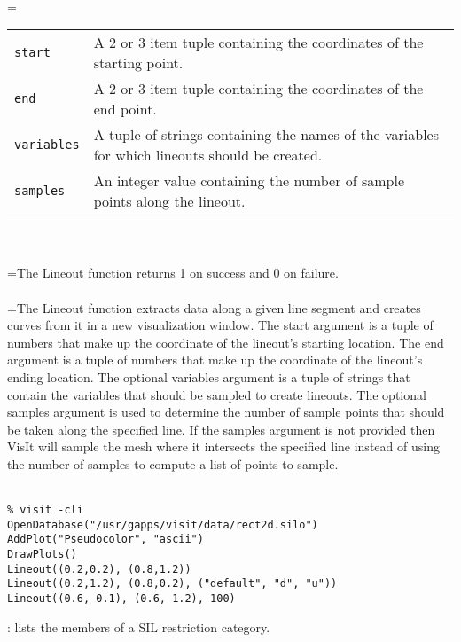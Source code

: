 \documentclass[10pt,a4paper]{report}
\begin{document}
 \\ 
\hangindent=\parindent 
\begin{tabular}{lp{9cm}}
\verb!start! & A 2 or 3 item tuple containing the coordinates of the starting point. \\
\verb!end! & A 2 or 3 item tuple containing the coordinates of the end point. \\
\verb!variables! & A tuple of strings containing the names of the variables for which lineouts should be created. \\
\verb!samples! & An integer value containing the number of sample points along the lineout. \\
\end{tabular} \\[-2mm]


 \\ 
\hangindent=\parindent The Lineout function returns 1 on success and 0 on failure. \\[-3mm] 

 \\ 
\hangindent=\parindent The Lineout function extracts data along a given line segment and creates curves from it in a new visualization window. The start argument is a tuple of numbers that make up the coordinate of the lineout's starting location. The end argument is a tuple of numbers that make up the coordinate of the lineout's ending location. The optional variables argument is a tuple of strings that contain the variables that should be sampled to create lineouts. The optional samples argument is used to determine the number of sample points that should be taken along the specified line. If the samples argument is not provided then VisIt will sample the mesh where it intersects the specified line instead of using the number of samples to compute a list of points to sample. \\[-3mm] 

\\[-6mm]
\begin{verbatim}% visit -cli
OpenDatabase("/usr/gapps/visit/data/rect2d.silo")
AddPlot("Pseudocolor", "ascii")
DrawPlots()
Lineout((0.2,0.2), (0.8,1.2))
Lineout((0.2,1.2), (0.8,0.2), ("default", "d", "u"))
Lineout((0.6, 0.1), (0.6, 1.2), 100)
\end{verbatim}
\newpage


{}
: lists the members of a SIL restriction category.\\[-3mm]
\end{document}
